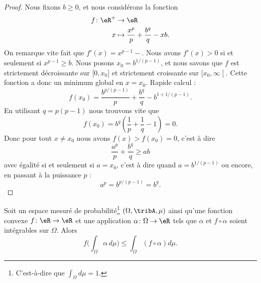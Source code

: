 \begin{proof}
	Nous fixons \( b\geq 0\), et nous considérons la fonction
	\begin{equation}
		\begin{aligned}
			f\colon \eR^+ & \to \eR                                         \\
			x             & \mapsto \frac{ x^p }{ p }+\frac{ b^q }{ q }-xb.
		\end{aligned}
	\end{equation}
	On remarque vite fait que \( f'(x)=x^{p-1}-\). Nous avons \( f'(x)>0\) si et seulement si \( x^{p-1}\geq b\). Nous posons \( x_0=b^{1/(p-1)}\), et nous savons que \( f\) est strictement décroissante sur \( \mathopen[ 0,x_0\mathclose]\) et strictement croissante sur \( \mathopen[ x_0,\infty\mathclose[\). Cette fonction a donc un minimum global en \( x=x_0\). Rapide calcul :
	\begin{equation}
		f(x_0)=\frac{ b^{p/(p-1)} }{ p }+\frac{ b^q }{ q }-b^{1+1/(p-1)}.
	\end{equation}
	En utilisant \( q=p(p-1)\) nous trouvons vite que
	\begin{equation}
		f(x_0)=b^q\left( \frac{1}{ p}+\frac{1}{ q}-1 \right)=0.
	\end{equation}
	Donc pour tout \( x\neq x_0\) nous avons \( f(x)>f(x_0)=0\), c'est à dire
	\begin{equation}
		\frac{ a^p }{ p }+\frac{ b^q }{ q }\geq ab
	\end{equation}
	avec égalité si et seulement si \( a=x_0\), c'est à dire quand \( a=b^{1/(p-1)}\) ou encore, en passant à la puissance \( p\) :
	\begin{equation}
		a^p=b^{p/(p-1)}=b^q.
	\end{equation}
\end{proof}

\begin{proposition} \label{PropXISooBxdaLk}
	Soit un espace mesuré de probabilité\footnote{C'est-à-dire que \( \int_{\Omega}d\mu=1\).} \( (\Omega,\tribA,\mu)\) ainsi qu'une fonction convexe \( f\colon \eR\to \eR\) et une application \( \alpha\colon \Omega\to \eR\) tels que \( \alpha\) et \( f\circ \alpha\) soient intégrables sur \( \Omega\). Alors
	\begin{equation}
		f\Big( \int_{\Omega}\alpha\,d\mu \Big)\leq \int_{\Omega}(f\circ\alpha) d\mu.
	\end{equation}
\end{proposition}

